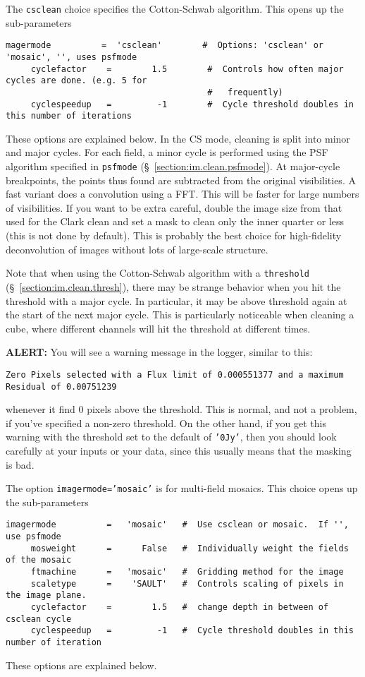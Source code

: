 The {\tt csclean} choice specifies the Cotton-Schwab algorithm.  This
opens up the sub-parameters
\small
\begin{verbatim}
magermode          =  'csclean'        #  Options: 'csclean' or 'mosaic', '', uses psfmode
     cyclefactor    =        1.5        #  Controls how often major cycles are done. (e.g. 5 for
                                        #   frequently)
     cyclespeedup   =         -1        #  Cycle threshold doubles in this number of iterations

\end{verbatim}
\normalsize
These options are explained below.
In the CS mode, cleaning is split into minor and major cycles. For each field, a
minor cycle is performed using the PSF algorithm specified in
{\tt psfmode} (\S~\ref{section:im.clean.psfmode}).
At major-cycle breakpoints, the points
thus found are subtracted from the original visibilities. A fast
variant does a convolution using a FFT. This will be faster for large
numbers of visibilities.  If you want to be extra careful, double the image 
size from that used for the Clark clean and set a mask to clean only
the inner quarter or less (this is not done by default).
This is probably the best choice for high-fidelity deconvolution 
of images without lots of large-scale structure.

Note that when using the Cotton-Schwab algorithm with a {\tt threshold}
(\S~\ref{section:im.clean.thresh}), there may be strange
behavior when you hit the threshold with a major cycle.  In
particular, it may be above threshold again at the start of the next
major cycle.  This is particularly noticeable when cleaning a cube,
where different channels will hit the threshold at different times.

{\bf ALERT:} You will see a warning message in the logger, 
similar to this:
\small
\begin{verbatim}
Zero Pixels selected with a Flux limit of 0.000551377 and a maximum Residual of 0.00751239
\end{verbatim}
\normalsize
whenever it find 0 pixels above the threshold.  This is normal,
and not a problem, if you've specified a non-zero threshold.
On the other hand, if you get this warning with the threshold set to
the default of {\tt '0Jy'}, then you should look carefully at your
inputs or your data, since this usually means that the masking is bad.

The option {\tt imagermode='mosaic'} is for multi-field mosaics.  This
choice opens up the sub-parameters 
\small
\begin{verbatim}
imagermode          =   'mosaic'   #  Use csclean or mosaic.  If '', use psfmode
     mosweight      =      False   #  Individually weight the fields of the mosaic
     ftmachine      =   'mosaic'   #  Gridding method for the image
     scaletype      =    'SAULT'   #  Controls scaling of pixels in the image plane.
     cyclefactor    =        1.5   #  change depth in between of  csclean cycle
     cyclespeedup   =         -1   #  Cycle threshold doubles in this number of iteration
\end{verbatim}
\normalsize
These options are explained below.  

